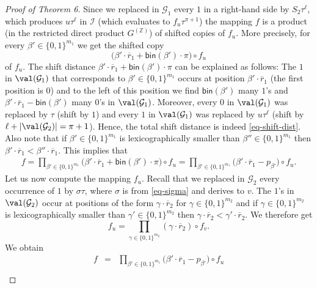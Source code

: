 \begin{proof}[Proof of Theorem 6]
Since we replaced in $\mathcal{G}_1$ every $1$ in a right-hand side by 
$S_2 \tau^\ell$, which produces $u \tau^\ell$ in $\mathcal{I}$ (which evaluates to $f_u \tau^{\pi+1}$)
the mapping $f$ is a product (in the restricted direct product $G^{(\mathbb{Z})}$) of shifted copies of $f_u$.
More precisely, for every $\beta' \in \{0,1\}^{m_1}$ we get the shifted copy 
\begin{equation} \label{eq-shift-dist}
 \big(\beta' \cdot \overline{r}_1 + \mathsf{bin}(\beta') \cdot \pi \big) \circ f_u 
\end{equation}
of $f_u$. The shift distance $\beta' \cdot \overline{r}_1 + \mathsf{bin}(\beta') \cdot \pi$ 
can be explained as follows: The $1$ in $\val(\mathcal{G}_1)$ that corresponds to $\beta' \in \{0,1\}^{m_1}$
occurs at position $\beta' \cdot \overline{r}_1$ (the first position is $0$) and to the left of this position we find $\mathsf{bin}(\beta')$ many
$1$'s and $\beta' \cdot \overline{r}_1 - \mathsf{bin}(\beta')$ many $0$'s in $\val(\mathcal{G}_1)$.
Moreover, every $0$ in $\val(\mathcal{G}_1)$ was replaced
by $\tau$ (shift by $1$) and every $1$ in $\val(\mathcal{G}_1)$ was replaced by $u \tau^\ell$ 
(shift by $\ell + |\val(\mathcal{G}_2)| = \pi + 1$). Hence, the total shift distance
is indeed  \eqref{eq-shift-dist}. Also note that
if $\beta' \in \{0,1\}^{m_1}$ is lexicographically smaller than $\beta'' \in \{0,1\}^{m_1}$ then 
$\beta' \cdot \overline{r}_1 < \beta'' \cdot \overline{r}_1$. 
This implies that 
\begin{eqnarray*}
f = \prod_{\beta' \in \{0,1\}^{m_1}}  \big(\beta' \cdot \overline{r}_1 + \mathsf{bin}(\beta') \cdot \pi \big) \circ f_u  = 
\prod_{\beta' \in \{0,1\}^{m_1}}  \big(\beta' \cdot \overline{r}_1 -p_{\beta'}  \big) \circ f_u .
\end{eqnarray*}
Let us now compute the mapping $f_u$. Recall that we replaced in $\mathcal{G}_2$ every occurrence of $1$ by  $\sigma \tau$, where $\sigma$ is from
\eqref{eq-sigma} and derives to $v$. The $1$'s in $\val(\mathcal{G}_2)$ occur at positions of the form $\gamma \cdot \overline{r}_2$
for $\gamma \in \{0,1\}^{m_2}$ and if $\gamma \in \{0,1\}^{m_2}$ is lexicographically smaller than $\gamma' \in \{0,1\}^{m_2}$ then 
$\gamma \cdot \overline{r}_2 < \gamma' \cdot \overline{r}_2$.
We therefore get
\[
f_u = \prod_{\gamma \in \{0,1\}^{m_2}}  (\gamma \cdot \overline{r}_2) \circ f_v . 
\]
We obtain 
\begin{eqnarray*}
f &=&  \prod_{\beta' \in \{0,1\}^{m_1}}  \big(\beta' \cdot \overline{r}_1 - p_{\beta'}\big) \circ f_u  \\

\end{eqnarray*}
\end{proof}
